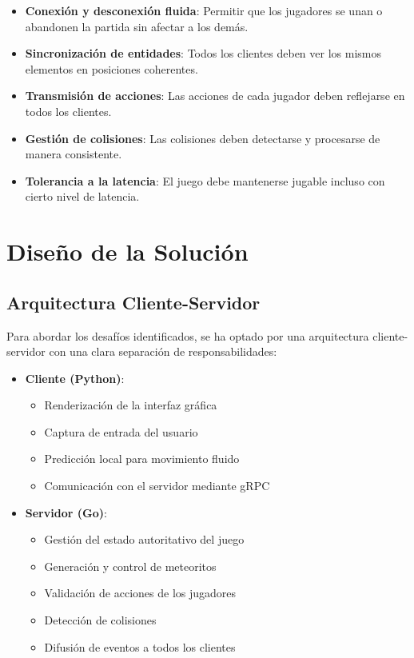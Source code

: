 \documentclass[11pt,letterpaper]{article}
\begin{document}
\begin{itemize}
    \item \textbf{Conexión y desconexión fluida}: Permitir que los jugadores se unan o abandonen la partida sin afectar a los demás.
    
    \item \textbf{Sincronización de entidades}: Todos los clientes deben ver los mismos elementos en posiciones coherentes.
    
    \item \textbf{Transmisión de acciones}: Las acciones de cada jugador deben reflejarse en todos los clientes.
    
    \item \textbf{Gestión de colisiones}: Las colisiones deben detectarse y procesarse de manera consistente.
    
    \item \textbf{Tolerancia a la latencia}: El juego debe mantenerse jugable incluso con cierto nivel de latencia.
\end{itemize}

\section{Diseño de la Solución}

\subsection{Arquitectura Cliente-Servidor}

Para abordar los desafíos identificados, se ha optado por una arquitectura cliente-servidor con una clara separación de responsabilidades:

\begin{itemize}
    \item \textbf{Cliente (Python)}:
    \begin{itemize}
        \item Renderización de la interfaz gráfica
        \item Captura de entrada del usuario
        \item Predicción local para movimiento fluido
        \item Comunicación con el servidor mediante gRPC
    \end{itemize}
    
    \item \textbf{Servidor (Go)}:
    \begin{itemize}
        \item Gestión del estado autoritativo del juego
        \item Generación y control de meteoritos
        \item Validación de acciones de los jugadores
        \item Detección de colisiones
        \item Difusión de eventos a todos los clientes
    \end{itemize}
\end{itemize}
\end{document}
